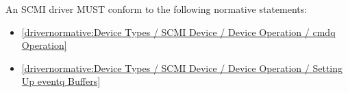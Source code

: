 \label{sec:Conformance / Driver Conformance / SCMI Driver Conformance}

An SCMI driver MUST conform to the following normative statements:

\begin{itemize}
\item \ref{drivernormative:Device Types / SCMI Device / Device Operation / cmdq Operation}
\item \ref{drivernormative:Device Types / SCMI Device / Device Operation / Setting Up eventq Buffers}
\end{itemize}

